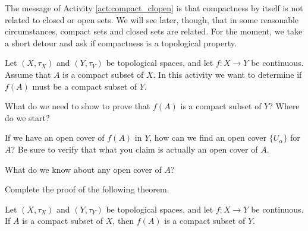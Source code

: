 \begin{comment}

\ActivitySolution

\ba
\item Suppose that $X$ is a topological space and $A = \{a_1, a_2, \ldots, a_n\}$ is a finite subset of $X$. If $\mathcal{O} = \{O_{\alpha}\}_{\alpha \in I}$ is an open cover of $A$, then for each $1 \leq k \leq n$ there is an $\alpha_k$ such that $a_k \in O_{\alpha_k}$. So $\{O_{\alpha_k}\}_{1 \leq k \leq n}$ is a finite subcover of $\mathcal{O}$. So every finite subset of a topological space is compact. 

\item The set $\{a\}$ is both open and compact in $X$.

\item The set $\{c\}$ is compact but not open in $X$.

\item The set $\{d\}$ is closed and compact in $X$.

\item The set $\{a\}$ is compact, but not closed because $\{a\}^c$ is not open. 


\ea

\end{comment}


The message of Activity \ref{act:compact_clopen} is that compactness by itself is not related to closed or open sets. We will see later, though, that in some reasonable circumstances, compact sets and closed sets are related. For the moment, we take a short detour and ask if compactness is a topological property. 

\begin{activity} \label{act:compact_invariant} Let $(X, \tau_X)$ and $(Y, \tau_Y)$ be topological spaces, and let $f: X \to Y$ be continuous. Assume that $A$ is a compact subset of $X$. In this activity we want to determine if $f(A)$ must be a compact subset of $Y$. 
\ba 
\item What do we need to show to prove that $f(A)$ is a compact subset of $Y$? Where do we start?

\item If we have an open cover of $f(A)$ in $Y$, how can we find an open cover $\{U_{\alpha}\}$ for $A$? Be sure to verify that what you claim is actually an open cover of $A$. 

\item What do we know about any open cover of $A$? 

\item Complete the proof of the following theorem.

\begin{theorem} Let $(X, \tau_X)$ and $(Y, \tau_Y)$ be topological spaces, and let $f: X \to Y$ be continuous. If $A$ is a compact subset of $X$, then $f(A)$ is a compact subset of $Y$. 
\end{theorem}

\ea

\end{activity}

